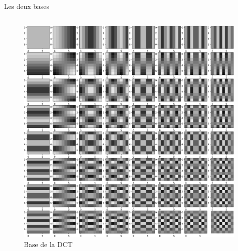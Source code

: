 \documentclass[xcolor=dvipsnames]{beamer}
\begin{document}
\begin{frame}{Les deux bases}
\begin{columns}
        \begin{column}{0.4\textwidth}
            \begin{figure}
                \centering
                \includegraphics[width=1\linewidth]{basedct.png}
                \caption{Base de la DCT}
            \end{figure}
        \end{column}
    \end{columns}

\end{frame}

\end{document}
